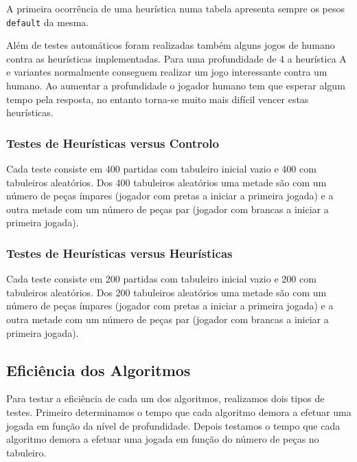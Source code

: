 A primeira ocorrência de uma heurística numa tabela apresenta sempre os pesos \verb|default| da mesma.

Além de testes automáticos foram realizadas também alguns jogos de humano contra as heurísticas implementadas. Para uma profundidade de 4 a heurística A e variantes normalmente conseguem realizar um jogo interessante contra um humano. Ao aumentar a profundidade o jogador humano tem que esperar algum tempo pela resposta, no entanto torna-se muito mais difícil vencer estas heurísticas. 

\subsubsection{Testes de Heurísticas versus Controlo}

Cada teste consiste em 400 partidas com tabuleiro inicial vazio e 400 com tabuleiros aleatórios. Dos 400 tabuleiros aleatórios uma metade são com um número de peças ímpares (jogador com pretas a iniciar a primeira jogada) e a outra metade com um número de peças par (jogador com brancas a iniciar a primeira jogada). 




\newpage
\subsubsection{Testes de Heurísticas versus Heurísticas}

Cada teste consiste em 200 partidas com tabuleiro inicial vazio e 200 com tabuleiros aleatórios. Dos 200 tabuleiros aleatórios uma metade são com um número de peças ímpares (jogador com pretas a iniciar a primeira jogada) e a outra metade com um número de peças par (jogador com brancas a iniciar a primeira jogada).




\subsection{Eficiência dos Algoritmos}

Para testar a eficiência de cada um dos algoritmos, realizamos dois tipos de testes. Primeiro determinamos o tempo que cada algoritmo demora a efetuar uma jogada em função da nível de profundidade. Depois testamos o tempo que cada algoritmo demora a efetuar uma jogada em função do número de peças no tabuleiro.

